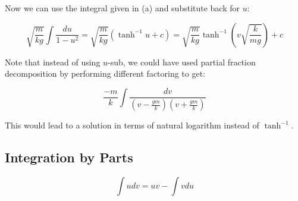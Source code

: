 \documentclass{article}
\begin{document}
Now we can use the integral given in (a) and substitute back for $u$:

\[ \tag{f} \sqrt{\frac{m}{kg}}\int{\frac{du}{1-u^2}} = \sqrt{\frac{m}{kg}}(\tanh^{-1}{u} + c) = \sqrt{\frac{m}{kg}}\tanh^{-1}{(v\sqrt{\frac{k}{mg}})} + c \]

Note that instead of using $u$-sub, we could have used partial fraction decomposition by performing different factoring to get:

\[ \tag{g} \frac{-m}{k} \int{\frac{dv}{(v-\frac{gm}{k})(v+\frac{gm}{k})}} \]

This would lead to a solution in terms of natural logarithm instead of $\tanh^{-1}$. 

\subsection{Integration by Parts}

\[ \int{udv} = uv - \int{vdu} \]
\end{document}

